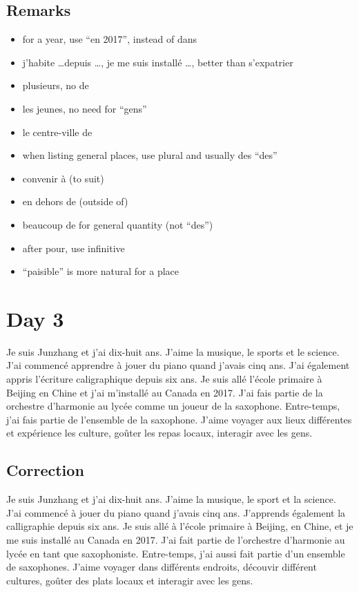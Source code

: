 \documentclass{book}
\begin{document}
    \subsection{Remarks}
        \begin{itemize}
            \item for a year, use ``en 2017'', instead of dans
            \item j'habite \dots depuis \dots, je me suis installé \dots, better than s'expatrier
            \item plusieurs, no de
            \item les jeunes, no need for ``gens''
            \item le centre-ville de
            \item when listing general places, use plural and usually des ``des''
            \item convenir à (to suit)
            \item en dehors de (outside of)
            \item beaucoup de for general quantity (not ``des'')
            \item after pour, use infinitive
            \item ``paisible'' is more natural for a place
        \end{itemize}

\section{Day 3}
    Je suis Junzhang et j'ai dix-huit ans. J'aime la musique, le sports et le science.
    J'ai commencé apprendre à jouer du piano quand j'avais cinq ans.
    J'ai également appris l'écriture caligraphique depuis six ans.
    Je suis allé l'école primaire à Beijing en Chine et j'ai m'installé au Canada en 2017.
    J'ai fais partie de la orchestre d'harmonie au lycée comme un joueur de la saxophone.
    Entre-temps, j'ai fais partie de l'ensemble de la saxophone.
    J'aime voyager aux lieux différentes et expérience les culture, goûter les repas locaux, interagir avec les gens.

    \subsection{Correction}
        Je suis Junzhang et j'ai dix-huit ans. 
        J'aime la musique, le sport et la science.
        J'ai commencé à jouer du piano quand j'avais cinq ans.
        J'apprends également la calligraphie depuis six ans.
        Je suis allé à l'école primaire à Beijing, en Chine, et je me suis installé au Canada en 2017.
        J'ai fait partie de l'orchestre d'harmonie au lycée en tant que saxophoniste.
        Entre-temps, j'ai aussi fait partie d'un ensemble de saxophones.
        J'aime voyager dans différents endroits, découvir différent cultures, goûter des plats locaux et interagir avec les gens.
\end{document}
